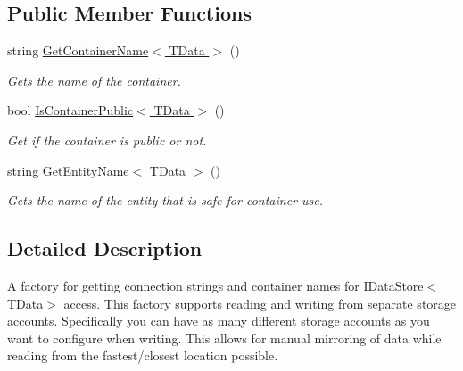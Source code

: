 \subsection*{Public Member Functions}
\begin{DoxyCompactItemize}
\item 
string \hyperlink{interfaceCqrs_1_1Azure_1_1BlobStorage_1_1DataStores_1_1IBlobStorageDataStoreConnectionStringFactory_a7c86fb71e24cd75b848f67e6864689ae_a7c86fb71e24cd75b848f67e6864689ae}{Get\+Container\+Name$<$ T\+Data $>$} ()
\begin{DoxyCompactList}\small\item\em Gets the name of the container. \end{DoxyCompactList}\item 
bool \hyperlink{interfaceCqrs_1_1Azure_1_1BlobStorage_1_1DataStores_1_1IBlobStorageDataStoreConnectionStringFactory_a328ddc36412d9d01fed52aeed545c1a4_a328ddc36412d9d01fed52aeed545c1a4}{Is\+Container\+Public$<$ T\+Data $>$} ()
\begin{DoxyCompactList}\small\item\em Get if the container is public or not. \end{DoxyCompactList}\item 
string \hyperlink{interfaceCqrs_1_1Azure_1_1BlobStorage_1_1DataStores_1_1IBlobStorageDataStoreConnectionStringFactory_ad7f6480ea3fa6dfab0953f05c2c15f85_ad7f6480ea3fa6dfab0953f05c2c15f85}{Get\+Entity\+Name$<$ T\+Data $>$} ()
\begin{DoxyCompactList}\small\item\em Gets the name of the entity that is safe for container use. \end{DoxyCompactList}\end{DoxyCompactItemize}


\subsection{Detailed Description}
A factory for getting connection strings and container names for I\+Data\+Store$<$\+T\+Data$>$ access. This factory supports reading and writing from separate storage accounts. Specifically you can have as many different storage accounts as you want to configure when writing. This allows for manual mirroring of data while reading from the fastest/closest location possible. 



